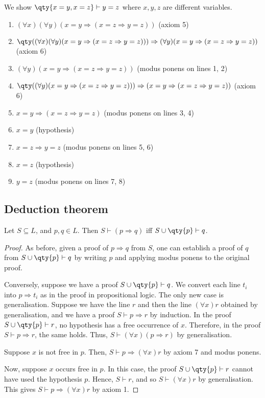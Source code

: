 \begin{example}
    We show $\qty{x = y, x = z} \vdash y = z$ where $x, y, z$ are different variables.
    \begin{enumerate}
        \item $(\forall x)(\forall y)(x = y \Rightarrow (x = z \Rightarrow y = z))$ (axiom 5)
        \item $\qty((\forall x)(\forall y)(x = y \Rightarrow (x = z \Rightarrow y = z))) \Rightarrow (\forall y)(x = y \Rightarrow (x = z \Rightarrow y = z))$ (axiom 6)
        \item $(\forall y)(x = y \Rightarrow (x = z \Rightarrow y = z))$ (modus ponens on lines 1, 2)
        \item $\qty((\forall y)(x = y \Rightarrow (x = z \Rightarrow y = z))) \Rightarrow (x = y \Rightarrow (x = z \Rightarrow y = z))$ (axiom 6)
        \item $x = y \Rightarrow (x = z \Rightarrow y = z)$ (modus ponens on lines 3, 4)
        \item $x = y$ (hypothesis)
        \item $x = z \Rightarrow y = z$ (modus ponens on lines 5, 6)
        \item $x = z$ (hypothesis)
        \item $y = z$ (modus ponens on lines 7, 8)
    \end{enumerate}
\end{example}

\subsection{Deduction theorem}
\begin{proposition}
    Let $S \subseteq L$, and $p, q \in L$.
    Then $S \vdash (p \Rightarrow q)$ iff $S \cup \qty{p} \vdash q$.
\end{proposition}
\begin{proof}
    As before, given a proof of $p \Rightarrow q$ from $S$, one can establish a proof of $q$ from $S \cup \qty{p} \vdash q$ by writing $p$ and applying modus ponens to the original proof.

    Conversely, suppose we have a proof $S \cup \qty{p} \vdash q$.
    We convert each line $t_i$ into $p \Rightarrow t_i$ as in the proof in propositional logic.
    The only new case is generalisation.
    Suppose we have the line $r$ and then the line $(\forall x) r$ obtained by generalisation, and we have a proof $S \vdash p \Rightarrow r$ by induction.
    In the proof $S \cup \qty{p} \vdash r$, no hypothesis has a free occurrence of $x$.
    Therefore, in the proof $S \vdash p \Rightarrow r$, the same holds.
    Thus, $S \vdash (\forall x)(p \Rightarrow r)$ by generalisation.

    Suppose $x$ is not free in $p$.
    Then, $S \vdash p \Rightarrow (\forall x)r$ by axiom 7 and modus ponens.

    Now, suppose $x$ occurs free in $p$.
    In this case, the proof $S \cup \qty{p} \vdash r$ cannot have used the hypothesis $p$.
    Hence, $S \vdash r$, and so $S \vdash (\forall x)r$ by generalisation.
    This gives $S \vdash p \Rightarrow (\forall x)r$ by axiom 1.
\end{proof}

